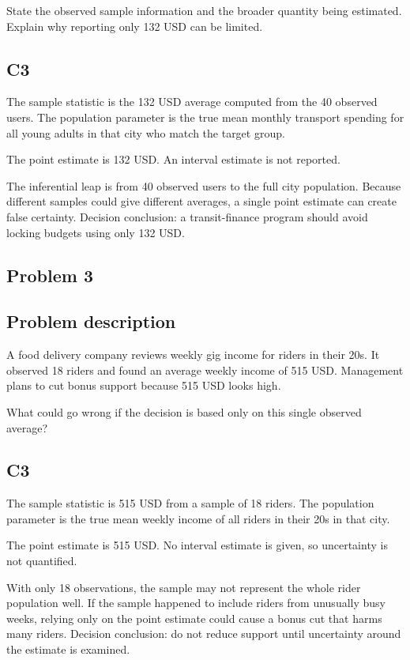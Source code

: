 \begin{ExamProblems}
		State the observed sample information and the broader quantity being estimated.
		Explain why reporting only 132 USD can be limited.

		\subsection*{C3}
		The sample statistic is the 132 USD average computed from the 40 observed users.
		The population parameter is the true mean monthly transport spending for all young adults in that city who match the target group.

		The point estimate is 132 USD.
		An interval estimate is not reported.

		The inferential leap is from 40 observed users to the full city population.
		Because different samples could give different averages, a single point estimate can create false certainty.
		Decision conclusion: a transit-finance program should avoid locking budgets using only 132 USD.

		\newpage
		\item
		\subsection*{Problem 3}
		\subsection*{Problem description}
		A food delivery company reviews weekly gig income for riders in their 20s.
		It observed 18 riders and found an average weekly income of 515 USD.
		Management plans to cut bonus support because 515 USD looks high.

		What could go wrong if the decision is based only on this single observed average?

		\subsection*{C3}
		The sample statistic is 515 USD from a sample of 18 riders.
		The population parameter is the true mean weekly income of all riders in their 20s in that city.

		The point estimate is 515 USD.
		No interval estimate is given, so uncertainty is not quantified.

		With only 18 observations, the sample may not represent the whole rider population well.
		If the sample happened to include riders from unusually busy weeks, relying only on the point estimate could cause a bonus cut that harms many riders.
		Decision conclusion: do not reduce support until uncertainty around the estimate is examined.


\end{ExamProblems}

